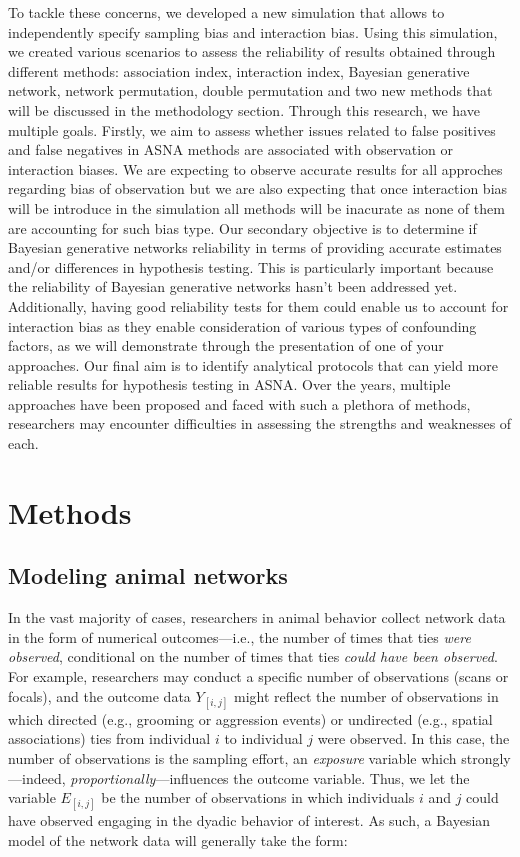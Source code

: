 \documentclass[Afour,sageh,times]{sagej}
\begin{document}
To tackle these concerns, we developed a new simulation that allows to independently specify sampling bias and interaction bias. Using this simulation, we created various scenarios to assess the reliability of results obtained through different methods: association index, interaction index, Bayesian generative network, network permutation, double permutation and two new methods that will be discussed in the methodology section. Through this research, we have multiple goals. Firstly, we aim to assess whether issues related to false positives and false negatives in ASNA methods are associated with observation or interaction biases. We are expecting to observe accurate results for all approches regarding bias of observation but we are also expecting that once interaction bias will be introduce in the simulation all methods will be inacurate as none of them are accounting for such bias type. Our secondary objective is to determine if Bayesian generative networks reliability in terms of providing accurate estimates and/or differences in hypothesis testing. This is particularly important because the reliability of Bayesian generative networks hasn't been addressed yet. Additionally, having good reliability tests for them could enable us to account for interaction bias as they enable consideration of various types of confounding factors, as we will demonstrate through the presentation of one of your approaches. Our final aim is to identify analytical protocols that can yield more reliable results for hypothesis testing in ASNA. Over the years, multiple approaches have been proposed and faced with such a plethora of methods, researchers may encounter difficulties in assessing the strengths and weaknesses of each.

\section{Methods}

\subsection{Modeling animal networks}
In the vast majority of cases, researchers in animal behavior  collect network data in the form of numerical outcomes---i.e., the number of times that ties \emph{were observed}, conditional on the number of times that ties \emph{could have been observed}. For example, researchers may conduct a specific number of observations (scans or focals), and the outcome data $Y_{[i,j]}$ might reflect the number of observations in which directed (e.g., grooming or aggression events) or undirected (e.g., spatial associations) ties from individual $i$ to individual $j$ were observed. In this case, the number of observations is the sampling effort,  an \emph{exposure} variable which strongly---indeed, \emph{proportionally}---influences the outcome variable. Thus, we let the variable $E_{[i,j]}$ be the number of observations in which individuals $i$ and $j$ could have observed engaging in the dyadic behavior of interest. As such, a Bayesian model of the network data will generally take the form:  
\end{document}
